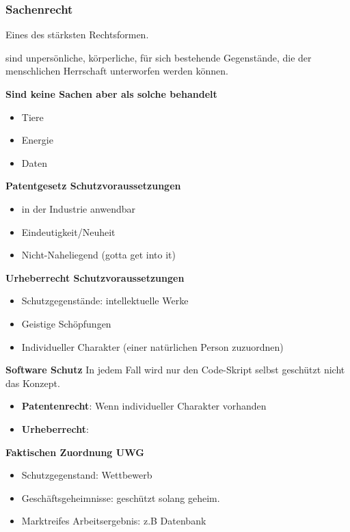 \subsubsection{Sachenrecht}
Eines des stärksten Rechtsformen. 
\begin{definition}
    [Sache] sind unpersönliche, körperliche, für sich bestehende Gegenstände, die der menschlichen Herrschaft unterworfen werden können.
\end{definition}

\textbf{Sind keine Sachen aber als solche behandelt}
\begin{itemize}
    \item Tiere
    \item Energie
    \item Daten
\end{itemize}
 
\textbf{Patentgesetz Schutzvoraussetzungen}
\begin{itemize}
    \item in der Industrie anwendbar
    \item Eindeutigkeit/Neuheit
    \item Nicht-Naheliegend (gotta get into it)
\end{itemize}

\textbf{Urheberrecht Schutzvoraussetzungen}
\begin{itemize}
    \item Schutzgegenstände: intellektuelle Werke
    \item Geistige Schöpfungen
    \item Individueller Charakter (einer natürlichen Person zuzuordnen)
\end{itemize}

\textbf{Software Schutz}
In jedem Fall wird nur den Code-Skript selbst geschützt nicht das Konzept.
\begin{itemize}
    \item \textbf{Patentenrecht}: Wenn individueller Charakter vorhanden 
    \item \textbf{Urheberrecht}: 
\end{itemize}

\textbf{Faktischen Zuordnung UWG}

\begin{itemize}
    \item Schutzgegenstand: Wettbewerb
    \item Geschäftsgeheimnisse: geschützt solang geheim.
    \item Marktreifes Arbeitsergebnis: z.B Datenbank
\end{itemize}